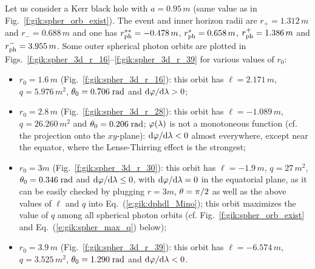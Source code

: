 \begin{example} \label{x:gik:outer_spher}
Let us consider a Kerr black hole with $a=0.95\, m$ (same value as in
Fig.~\ref{f:gik:spher_orb_exist}). The event and inner horizon radii
are $r_+ = 1.312\, m$ and $r_- = 0.688\, m$ and one has
$r_{\rm ph}^{**} = - 0.478\, m$, $r_{\rm ph}^{*} = 0.658\, m$,
$r_{\rm ph}^+ = 1.386\, m$ and $r_{\rm ph}^- = 3.955\, m$.
Some outer spherical photon orbits are plotted in
Figs.~\ref{f:gik:spher_3d_r_16}--\ref{f:gik:spher_3d_r_39}
for various values of $r_0$:
\begin{itemize}
\item $r_0 = 1.6\, m$ (Fig.~\ref{f:gik:spher_3d_r_16}): this orbit
has $\ell = 2.171\, m$, $q=5.976\, m^2$, $\theta_0 = 0.706\;{\rm rad}$ and $\mathrm{d}\varphi/\mathrm{d}\lambda > 0$;
\item $r_0 = 2.8\, m$ (Fig.~\ref{f:gik:spher_3d_r_28}): this orbit
has $\ell = -1.089\, m$, $q=26.260\, m^2$ and $\theta_0 = 0.206\;{\rm rad}$;
$\varphi(\lambda)$ is not a monotoneous function (cf. the projection onto the $xy$-plane):
$\mathrm{d}\varphi/\mathrm{d}\lambda < 0$ almost everywhere, except
near the equator, where the Lense-Thirring effect is the strongest;
\item $r_0 = 3 m$ (Fig.~\ref{f:gik:spher_3d_r_30}): this orbit
has $\ell = -1.9\, m$, $q=27\, m^2$, $\theta_0 = 0.346\;{\rm rad}$ and
$\mathrm{d}\varphi/\mathrm{d}\lambda \leq 0$, with $\mathrm{d}\varphi/\mathrm{d}\lambda = 0$ in the equatorial plane,
as it can be easily checked by plugging $r=3m$, $\theta=\pi/2$ as well as
the above values of $\ell$ and $q$ into Eq.~(\ref{e:gik:dphdl_Mino});
this orbit maximizes the value of $q$ among all spherical photon orbits
(cf. Fig.~\ref{f:gik:spher_orb_exist} and Eq.~(\ref{e:gik:spher_max_q}) below);
\item $r_0 = 3.9\, m$ (Fig.~\ref{f:gik:spher_3d_r_39}): this orbit
has $\ell = -6.574\, m$, $q=3.525\, m^2$, $\theta_0 = 1.290\;{\rm rad}$
and $\mathrm{d}\varphi/\mathrm{d}\lambda < 0$.
\end{itemize}
\end{example}

